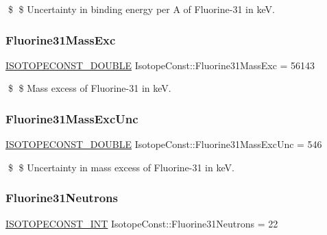 \$ \$ Uncertainty in binding energy per A of Fluorine-\/31 in keV. \mbox{\label{group___isotope_const-_fluorine-_f31_gaa2f0b093a8e13b9fc29731be2f6fcfeb}} 
\subsubsection{\texorpdfstring{Fluorine31\+Mass\+Exc}{Fluorine31MassExc}}
{\footnotesize\ttfamily \mbox{\hyperlink{group___isotope_const-_macros_ga8f45a7272ce02c0b4c65c44636ed719a}{I\+S\+O\+T\+O\+P\+E\+C\+O\+N\+S\+T\+\_\+\+D\+O\+U\+B\+LE}} Isotope\+Const\+::\+Fluorine31\+Mass\+Exc = 56143}

\$ \$ Mass excess of Fluorine-\/31 in keV. \mbox{\label{group___isotope_const-_fluorine-_f31_ga7ca988285f30b7955f08ab7079242639}} 
\subsubsection{\texorpdfstring{Fluorine31\+Mass\+Exc\+Unc}{Fluorine31MassExcUnc}}
{\footnotesize\ttfamily \mbox{\hyperlink{group___isotope_const-_macros_ga8f45a7272ce02c0b4c65c44636ed719a}{I\+S\+O\+T\+O\+P\+E\+C\+O\+N\+S\+T\+\_\+\+D\+O\+U\+B\+LE}} Isotope\+Const\+::\+Fluorine31\+Mass\+Exc\+Unc = 546}

\$ \$ Uncertainty in mass excess of Fluorine-\/31 in keV. \mbox{\label{group___isotope_const-_fluorine-_f31_ga30fee3e12f2111f5edaccc2278cbc4e6}} 
\subsubsection{\texorpdfstring{Fluorine31\+Neutrons}{Fluorine31Neutrons}}
{\footnotesize\ttfamily \mbox{\hyperlink{group___isotope_const-_macros_ga5f18360b3e99483a35c32d789e62621c}{I\+S\+O\+T\+O\+P\+E\+C\+O\+N\+S\+T\+\_\+\+I\+NT}} Isotope\+Const\+::\+Fluorine31\+Neutrons = 22}

